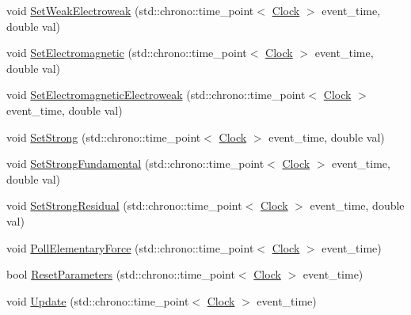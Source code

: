 \begin{DoxyCompactItemize}
void \mbox{\hyperlink{classElementaryForce_a38d4f86f18a9f84a4198ee43bc90f6b4}{Set\+Weak\+Electroweak}} (std\+::chrono\+::time\+\_\+point$<$ \mbox{\hyperlink{universe_8h_a0ef8d951d1ca5ab3cfaf7ab4c7a6fd80}{Clock}} $>$ event\+\_\+time, double val)
\item 
void \mbox{\hyperlink{classElementaryForce_a67f6845bd715c29c17387d291b343a1b}{Set\+Electromagnetic}} (std\+::chrono\+::time\+\_\+point$<$ \mbox{\hyperlink{universe_8h_a0ef8d951d1ca5ab3cfaf7ab4c7a6fd80}{Clock}} $>$ event\+\_\+time, double val)
\item 
void \mbox{\hyperlink{classElementaryForce_af4f12038c33d7edf9f13339fcd632ec9}{Set\+Electromagnetic\+Electroweak}} (std\+::chrono\+::time\+\_\+point$<$ \mbox{\hyperlink{universe_8h_a0ef8d951d1ca5ab3cfaf7ab4c7a6fd80}{Clock}} $>$ event\+\_\+time, double val)
\item 
void \mbox{\hyperlink{classElementaryForce_aa1b5708cfab2069049fec5c924e1f246}{Set\+Strong}} (std\+::chrono\+::time\+\_\+point$<$ \mbox{\hyperlink{universe_8h_a0ef8d951d1ca5ab3cfaf7ab4c7a6fd80}{Clock}} $>$ event\+\_\+time, double val)
\item 
void \mbox{\hyperlink{classElementaryForce_afb00e9a10ec33eeb1daefce39b0468b7}{Set\+Strong\+Fundamental}} (std\+::chrono\+::time\+\_\+point$<$ \mbox{\hyperlink{universe_8h_a0ef8d951d1ca5ab3cfaf7ab4c7a6fd80}{Clock}} $>$ event\+\_\+time, double val)
\item 
void \mbox{\hyperlink{classElementaryForce_ac25021d38c1d54bf711096ab37a461f6}{Set\+Strong\+Residual}} (std\+::chrono\+::time\+\_\+point$<$ \mbox{\hyperlink{universe_8h_a0ef8d951d1ca5ab3cfaf7ab4c7a6fd80}{Clock}} $>$ event\+\_\+time, double val)
\item 
void \mbox{\hyperlink{classElementaryForce_aa5ab479744dbf3e8578f8d2974299ff7}{Poll\+Elementary\+Force}} (std\+::chrono\+::time\+\_\+point$<$ \mbox{\hyperlink{universe_8h_a0ef8d951d1ca5ab3cfaf7ab4c7a6fd80}{Clock}} $>$ event\+\_\+time)
\item 
bool \mbox{\hyperlink{classElementaryForce_a1dedcd23a538b87f71ecd43cb36a6db5}{Reset\+Parameters}} (std\+::chrono\+::time\+\_\+point$<$ \mbox{\hyperlink{universe_8h_a0ef8d951d1ca5ab3cfaf7ab4c7a6fd80}{Clock}} $>$ event\+\_\+time)
\item 
void \mbox{\hyperlink{classElementaryForce_a982ff47dd99c806d229ed89df9bd93ef}{Update}} (std\+::chrono\+::time\+\_\+point$<$ \mbox{\hyperlink{universe_8h_a0ef8d951d1ca5ab3cfaf7ab4c7a6fd80}{Clock}} $>$ event\+\_\+time)
\end{DoxyCompactItemize}
